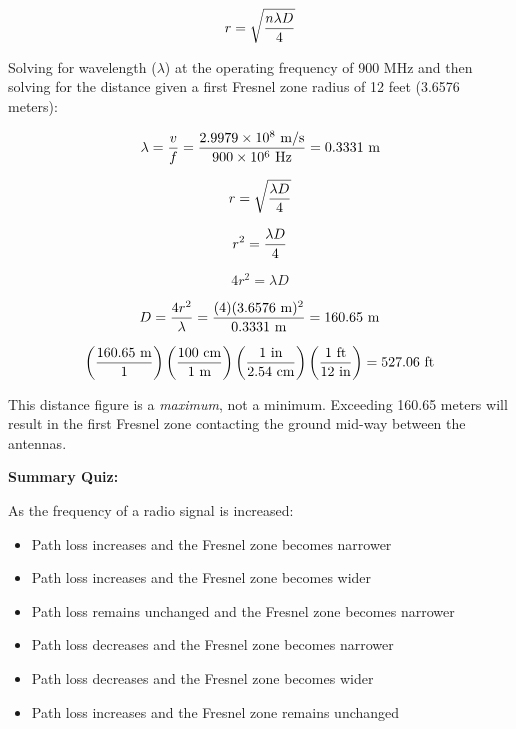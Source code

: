 $$r = \sqrt{n \lambda D \over 4}$$

Solving for wavelength ($\lambda$) at the operating frequency of 900 MHz and then solving for the distance given a first Fresnel zone radius of 12 feet (3.6576 meters):

$$\lambda = {v \over f} = {2.9979 \times 10^{8} \hbox{ m/s} \over 900 \times 10^6 \hbox{ Hz}} = 0.3331 \hbox{ m}$$

$$r = \sqrt{\lambda D \over 4}$$

$$r^2 = {\lambda D \over 4}$$

$$4r^2 = \lambda D$$

$$D = {4r^2 \over \lambda} = {(4) (3.6576 \hbox{ m})^2 \over 0.3331 \hbox{ m}} = 160.65 \hbox{ m}$$

$$\left(160.65 \hbox{ m} \over 1 \right) \left(100 \hbox{ cm} \over 1 \hbox{ m} \right) \left(1 \hbox{ in} \over 2.54 \hbox{ cm} \right) \left(1 \hbox{ ft} \over 12 \hbox{ in} \right) = 527.06 \hbox{ ft}$$

This distance figure is a {\it maximum}, not a minimum.  Exceeding 160.65 meters will result in the first Fresnel zone contacting the ground mid-way between the antennas.













\vfil \eject

\noindent
{\bf Summary Quiz:}

As the frequency of a radio signal is increased:

\begin{itemize}
\item{} Path loss increases and the Fresnel zone becomes narrower
\vskip 5pt 
\item{} Path loss increases and the Fresnel zone becomes wider
\vskip 5pt 
\item{} Path loss remains unchanged and the Fresnel zone becomes narrower
\vskip 5pt 
\item{} Path loss decreases and the Fresnel zone becomes narrower
\vskip 5pt 
\item{} Path loss decreases and the Fresnel zone becomes wider
\vskip 5pt 
\item{} Path loss increases and the Fresnel zone remains unchanged
\end{itemize}





